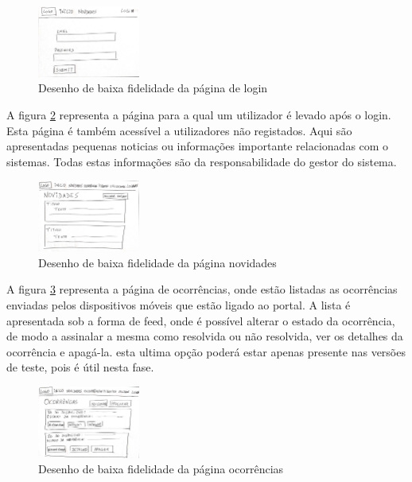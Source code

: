 \begin{figure}[!htb]
	\centering
	\includegraphics[width=0.3\textwidth, frame]{figuras/storyboard/frame_1.jpg}
	\caption{Desenho de baixa fidelidade da página de login}
	\label{fig:login}
\end{figure}

A figura \ref{fig:novidades} representa a página para a qual um utilizador é levado após o login. Esta página é também acessível a utilizadores não registados. Aqui são apresentadas pequenas noticias ou informações importante relacionadas com o sistemas. Todas estas informações são da responsabilidade do gestor do sistema.

\begin{figure}[!htb]
	\centering
	\includegraphics[width=0.3\textwidth, frame]{figuras/storyboard/frame_2.jpg}
	\caption{Desenho de baixa fidelidade da página novidades}
	\label{fig:novidades}
\end{figure}

A figura \ref{fig:ocorrencias} representa a página de ocorrências, onde estão listadas as ocorrências enviadas pelos dispositivos móveis que estão ligado ao portal. A lista é apresentada sob a forma de feed, onde é possível alterar o estado da ocorrência, de modo a assinalar a mesma como resolvida ou não resolvida, ver os detalhes da ocorrência e apagá-la. esta ultima opção poderá estar apenas presente nas versões de teste, pois é útil nesta fase.

\begin{figure}[!htb]
\centering
\includegraphics[width=0.3\textwidth, frame]{figuras/storyboard/frame_3.jpg}
\caption{Desenho de baixa fidelidade da página ocorrências}
\label{fig:ocorrencias}
\end{figure}

